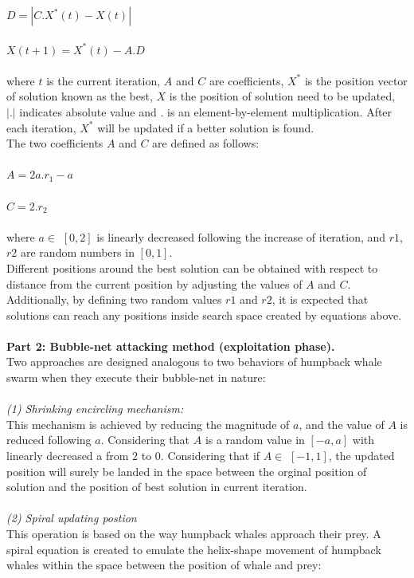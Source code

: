 \documentclass[a4paper]{article}
\begin{document}
$D = |C.X^*(t) - X(t)|$ \\ \\
$X(t+1) = X^*(t) - A.D$ \\ \\
where $t$ is the current iteration, $A$ and $C$ are coefficients, $X^*$ is the position vector of solution known as the best, $X$ is the position of solution need to be updated, $|.|$ indicates absolute value and $.$ is an element-by-element multiplication. After each iteration, $X^*$ will be updated if a better solution is found. \\
The two coefficients $A$ and $C$ are defined as follows: \\ \\
$A = 2a.r_1 - a$ \\ \\
$C = 2.r_2$ \\ \\ 
where $a \in$ $[0,2]$ is linearly decreased following the increase of iteration, and $r1$, $r2$ are random numbers in $[0,1]$. \\
Different positions around the best solution can be obtained with respect to distance from the current position by adjusting the values  of $A$ and $C$. Additionally, by defining two random values $r1$ and $r2$, it is expected that solutions can reach any positions inside search space created by equations above. \\ \\
\textbf{Part 2: Bubble-net attacking method (exploitation phase).}\\
Two approaches are designed analogous to two behaviors of humpback whale swarm when they execute their bubble-net in nature:\\ \\
\textit{(1) Shrinking encircling mechanism:} \\
This mechanism is achieved by reducing the magnitude of $a$, and the value of $A$ is reduced following $a$. Considering that $A$ is a random value in $[-a,a]$ with linearly decreased a from $2$ to $0$. Considering that if $A \in$ $[-1,1]$, the updated position will surely be landed in the space between the orginal position of solution and the position of best solution in current iteration. \\ \\
\textit{(2) Spiral updating postion} \\
This operation is based on the way humpback whales approach their prey. A spiral equation is created to emulate the helix-shape movement of humpback whales within the space between the position of whale and prey: \\ \\
\end{document}

